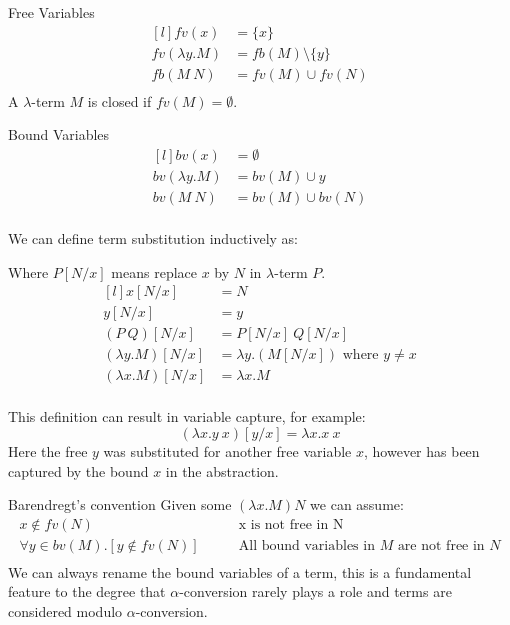 \begin{tcbraster}[raster columns=2, raster equal height]
    \begin{definitionbox}{Free Variables}
        \[\begin{matrix*}[l]
            fv(x) & = \{x\} \\
            fv(\lambda y . M) & = fb(M) \setminus \{y\} \\
            fb(M \ N) &= fv(M) \cup fv(N) \\
        \end{matrix*}\]
        A $\lambda$-term $M$ is closed if $fv(M) = \emptyset$.
    \end{definitionbox}
    \begin{definitionbox}{Bound Variables}
        \[\begin{matrix*}[l]
            bv(x) &= \emptyset \\
            bv(\lambda y . M) &= bv(M) \cup y \\
            bv(M \ N) &= bv(M) \cup bv(N) \\
        \end{matrix*}\]
    \end{definitionbox}
\end{tcbraster}
We can define term substitution inductively as:
\\ \begin{minipage}{.45\textwidth}
    Where $P[N/x]$ means replace $x$ by $N$ in $\lambda$-term $P$.
    \[\begin{matrix*}[l]
        x[N/x] & = N \\
        y[N/x] & = y \\
        (P \ Q)[N/x] & = P[N/x] \ Q[N/x] \\
        (\lambda y . M)[N/x] &= \lambda y.(M[N/x]) \text{ where } y \neq x \\
        (\lambda x . M)[N/x] &= \lambda x.M \\
    \end{matrix*}\]
\end{minipage}
\begin{minipage}{.55\textwidth}
    This definition can result in variable capture, for example:
    \[(\lambda x . y \ x) [y/x] = \lambda x . x \ x\]
    Here the free $y$ was substituted for another free variable $x$, however has been captured by the bound $x$ in the abstraction.
\end{minipage}
\begin{definitionbox}{Barendregt's convention}
    Given some $(\lambda x . M) N$ we can assume:
    \[\begin{split}
        x \not\in fv(N) & \qquad \text{x is not free in N} \\
        \forall y \in bv(M) . [y \not\in fv(N)] & \qquad \text{All bound variables in }M\text{ are not free in }N \\
    \end{split}\]
    We can always rename the bound variables of a term, this is a fundamental feature to the degree that $\alpha$-conversion rarely plays a role and terms are considered modulo $\alpha$-conversion.
\end{definitionbox}
